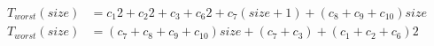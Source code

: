\begin{subequations}
\label{eq:analyse-arlabeling-sortlabels-initlabelmemory-1}
\begin{align}
\label{eq:analyse-arlabeling-sortlabels-initlabelmemory-1-1}
T_{worst}(\mathit{size})& = c_{1}2 + c_{2}2 + c_{3} + c_{6}2 + c_{7}(\mathit{size} + 1) + (c_{8} + c_{9}
 + c_{10})\mathit{size} \\
\label{eq:analyse-arlabeling-sortlabels-initlabelmemory-1-2}
T_{worst}(\mathit{size})& = (c_{7} + c_{8} + c_{9} + c_{10})\mathit{size} + (c_{7} + c_{3}) + (c_{1} + c_{2} + c_{6})2
\end{align}
\end{subequations}
